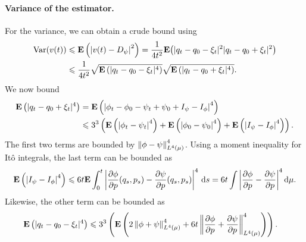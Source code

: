 \documentclass[11pt,a4paper]{article}
\newcommand{\expect}[0]{\mathbf{E}}
\renewcommand{\d}{\mathrm d}
\theoremstyle{plain}
\numberwithin{equation}{section}
\renewcommand{\leq}{\leqslant}
\begin{document}
\paragraph{Variance of the estimator.}%
For the variance, we can obtain a crude bound using
\begin{align*}
    \mathrm{Var} (v(t))
    &\leq \expect \left( \abs{v(t) - D_{\psi}}^2 \right)
    = \frac{1}{4 t^2} \expect \big( |q_t - q_0 - \xi_t|^2 |q_t - q_0 + \xi_t|^2 \big) \\
    &\leq \frac{1}{4 t^2} \sqrt{\expect \left(  |q_t - q_0 - \xi_t|^4 \right)} \sqrt{\expect \left( |q_t - q_0 + \xi_t|^4 \right)}.
\end{align*}
We now bound
\begin{align*}
    \expect \left( |q_t - q_0 + \xi_t|^4 \right)
    &= \expect \left( \abs{\phi_t - \phi_0 - \psi_t + \psi_0 + I_{\psi} - I_{\phi}}^4 \right) \\
    &\leq 3^3 \left( \expect \left( \abs{\phi_t - \psi_t}^4 \right) + \expect \left( \abs{\phi_0 - \psi_0}^4 \right) + \expect \left( \abs{I_{\psi} - I_{\phi}}^4 \right) \right).
\end{align*}
The first two terms are bounded by $\norm{\phi - \psi}_{L^4(\mu)}^4$.
Using a moment inequality for It\^o integrals, the last term can be bounded as
\[
    \expect \left( \abs{I_{\psi} - I_{\phi}}^4 \right) \leq 6 t \expect \int_{0}^{t} \abs{\derivative{1}[\phi]{p}(q_s, p_s) - \derivative{1}[\psi]{p}(q_s, p_s)}^4 \, \d s = 6 t \int \abs{\derivative{1}[\phi]{p} - \derivative{1}[\psi]{p}}^4 \d \mu.
\]
Likewise, the other term can be bounded as
\begin{align*}
    \expect \left( |q_t - q_0 - \xi_t|^4 \right)
    &\leq 3^3 \left( \expect \left( 2 \norm{\phi + \psi}[L^4(\mu)]^4 + 6 t \norm{\derivative{1}[\phi]{p} + \derivative{1}[\psi]{p}}[L^{4}(\mu)]^4 \right) \right).
\end{align*}

\end{document}
